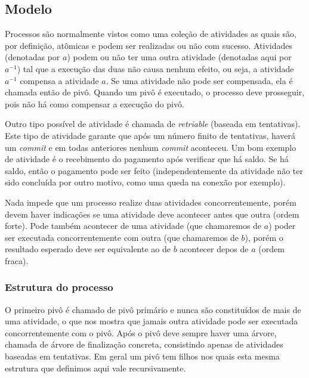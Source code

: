 \documentclass[a4paper,12pt,notitlepage]{article}
\begin{document}
\subsection{Modelo}

Processos são normalmente vistos como uma coleção de atividades as quais são, por definição, atômicas e podem ser realizadas ou não com sucesso. Atividades (denotadas por $a$) podem ou não ter uma outra atividade (denotadas aqui por $a^{-1}$) tal que a execução das duas não causa nenhum efeito, ou seja, a atividade $a^{-1}$ compensa a atividade $a$. Se uma atividade não pode
ser compensada, ela é chamada então de pivô. Quando um pivô é executado, o processo deve prosseguir, pois não há como compensar a execução do pivô.

Outro tipo possível de atividade é chamada de \textit{retriable} (baseada em tentativas). Este tipo de atividade garante que após um número finito de tentativas, haverá um \textit{commit} e em todas anteriores nenhum \textit{commit} aconteceu. Um bom exemplo de atividade é o recebimento do pagamento após verificar que há saldo. Se há saldo, então o pagamento pode ser feito (independentemente da atividade não ter sido concluída por outro motivo, como uma queda na conexão por exemplo).

Nada impede que um processo realize duas atividades concorrentemente, porém devem haver indicações se uma atividade deve acontecer antes que outra (ordem forte). Pode também acontecer de uma atividade (que chamaremos de $a$) poder ser executada concorrentemente com outra (que chamaremos de $b$), porém o resultado esperado deve ser equivalente ao de $b$ acontecer depos de $a$ (ordem fraca).

\subsubsection{Estrutura do processo}

O primeiro pivô é chamado de pivô primário e nunca são constituídos de mais de uma atividade, o que nos mostra que jamais outra atividade pode ser executada concorrentemente com o pivô. Após o pivô deve sempre haver uma árvore, chamada de árvore de finalização concreta, consistindo apenas de atividades baseadas em tentativas. Em geral um pivô tem filhos nos quais esta mesma estrutura que definimos aqui vale recursivamente.
\end{document}
